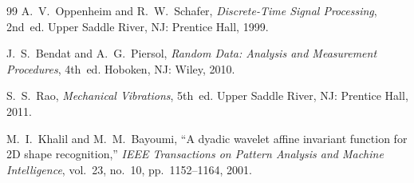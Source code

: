 \begin{thebibliography}{99}
A.~V.~Oppenheim and R.~W.~Schafer,
\textit{Discrete-Time Signal Processing}, 2nd~ed.
Upper Saddle River, NJ: Prentice Hall, 1999.

J.~S.~Bendat and A.~G.~Piersol,
\textit{Random Data: Analysis and Measurement Procedures}, 4th~ed.
Hoboken, NJ: Wiley, 2010.

S.~S.~Rao,
\textit{Mechanical Vibrations}, 5th~ed.
Upper Saddle River, NJ: Prentice Hall, 2011.

M.~I.~Khalil and M.~M.~Bayoumi,
``A dyadic wavelet affine invariant function for 2D shape recognition,''
\textit{IEEE Transactions on Pattern Analysis and Machine Intelligence}, vol.~23, no.~10, pp.~1152--1164, 2001.

\end{thebibliography}
